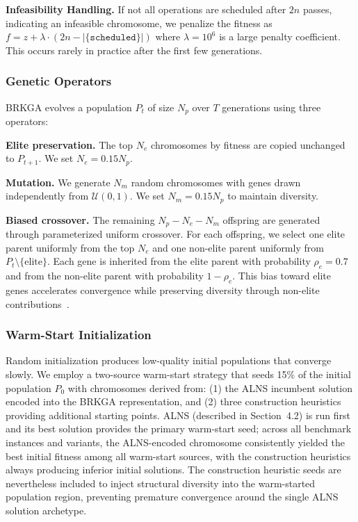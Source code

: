 \documentclass{article}
\begin{document}
\textbf{Infeasibility Handling.} If not all operations are scheduled after $2n$ passes, indicating an infeasible chromosome, we penalize the fitness as $f = z + \lambda \cdot (2n - |\{\texttt{scheduled}\}|)$ where $\lambda = 10^6$ is a large penalty coefficient. This occurs rarely in practice after the first few generations.

\subsubsection{Genetic Operators}

BRKGA evolves a population $P_t$ of size $N_p$ over $T$ generations using three operators:

\textbf{Elite preservation.} The top $N_e$ chromosomes by fitness are copied unchanged to $P_{t+1}$. We set $N_e = 0.15 N_p$.

\textbf{Mutation.} We generate $N_m$ random chromosomes with genes drawn independently from $\mathcal{U}(0,1)$. We set $N_m = 0.15 N_p$ to maintain diversity.

\textbf{Biased crossover.} The remaining $N_p - N_e - N_m$ offspring are generated through parameterized uniform crossover. For each offspring, we select one elite parent uniformly from the top $N_e$ and one non-elite parent uniformly from $P_t \setminus \{\text{elite}\}$. Each gene is inherited from the elite parent with probability $\rho_e = 0.7$ and from the non-elite parent with probability $1 - \rho_e$. This bias toward elite genes accelerates convergence while preserving diversity through non-elite contributions~\cite{goncalves2011}.

\subsubsection{Warm-Start Initialization}

Random initialization produces low-quality initial populations that converge slowly. We employ a two-source warm-start strategy that seeds 15\% of the initial population $P_0$ with chromosomes derived from: (1) the ALNS incumbent solution encoded into the BRKGA representation, and (2) three construction heuristics providing additional starting points. ALNS (described in Section~4.2) is run first and its best solution provides the primary warm-start seed; across all benchmark instances and variants, the ALNS-encoded chromosome consistently yielded the best initial fitness among all warm-start sources, with the construction heuristics always producing inferior initial solutions. The construction heuristic seeds are nevertheless included to inject structural diversity into the warm-started population region, preventing premature convergence around the single ALNS solution archetype.
\end{document}
